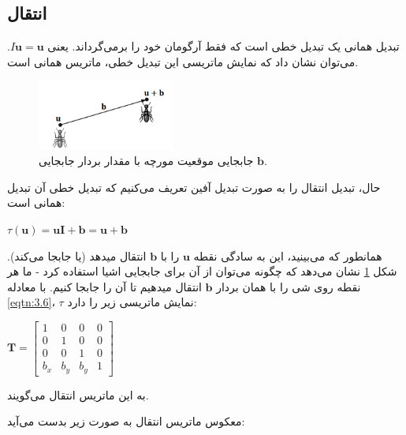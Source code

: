 \subsection{\textbf{انتقال}}
\label{subsec:3.2.3}
{
    \Large
    \begin{spacing}{1.5}
        تبدیل همانی یک تبدیل خطی است که فقط آرگومان خود را برمی‌گرداند.
        یعنی $I\textbf{u}=\textbf{u}$.
        می‌توان نشان داد که نمایش ماتریسی این تبدیل خطی، ماتریس همانی است.
        \begin{figure}[H]
            \centering
            \setlength{\belowcaptionskip}{-10pt}
            \includegraphics[width=0.4\textwidth]{Images/4/3/4.Session.1.3.5}
            \caption {جابجایی موقعیت مورچه با مقدار بردار جابجایی $\textbf{b}$.}
            \label{fig:4.Session.1.3.5}
        \end{figure}
        حال، تبدیل انتقال را به صورت تبدیل آفین تعریف می‌کنیم که تبدیل خطی آن تبدیل همانی است:
        \begin{center}
            $\tau(\textbf{u})=\textbf{uI}+\textbf{b}=\textbf{u}+\textbf{b}$
        \end{center}
        همانطور که می‌بینید، این به سادگی نقطه $\textbf{u}$ را با $\textbf{b}$ انتقال میدهد (یا جابجا می‌کند).
        شکل \ref{fig:4.Session.1.3.5} نشان می‌دهد که چگونه می‌توان از آن برای جابجایی اشیا استفاده کرد - ما هر نقطه روی شی را با همان بردار $\textbf{b}$ انتقال میدهیم تا آن را جابجا کنیم.
        با معادله \ref{eqtn:3.6}، $\tau$ نمایش ماتریسی زیر را دارد:

        \begin{center}
            $\textbf{T}=\begin{bmatrix}
                            1     & 0     & 0     & 0 \\
                            0     & 1     & 0     & 0 \\
                            0     & 0     & 1     & 0 \\
                            b_{x} & b_{y} & b_{y} & 1
            \end{bmatrix}$
        \end{center}
        به این ماتریس انتقال می‌گویند.

        معکوس ماتریس انتقال به صورت زیر بدست می‌آید:


\end{spacing}}
